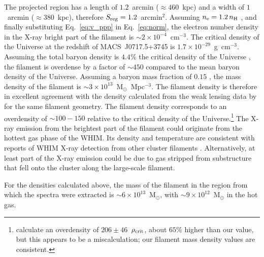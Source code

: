 The projected region has a length of $1.2$~arcmin ($\approx 460$~kpc) and a width of $1$~arcmin ($\approx 380$~kpc), therefore $S_{\rm reg} = 1.2$~arcmin$^{2}$. Assuming $n_{\rm e} = 1.2\, n_{\rm H}$ \citep[e.g.,][]{Bohringer2010}, and finally substituting Eq.~\ref{eq:v_ppp} in Eq.~\ref{eq:norm}, the electron number density in the X-ray bright part of the filament is $\sim 2\times 10^{-4}$~cm$^{-3}$. The critical density of the Universe at the redshift of MACS~J0717.5+3745 is $1.7\times 10^{-29}$~g~cm$^{-3}$. Assuming the total baryon density is $4.4\%$ the critical density of the Universe \citep{Kirkman2003}, the filament is overdense by a factor of $\sim 450$ compared to the mean baryon density of the Universe. Assuming a baryon mass fraction of $0.15$ \citep[e.g.,][]{Mantz2014}, the mass density of the filament is $\sim 3\times 10^{13}$~M$_{\odot}$~Mpc$^{-3}$. The filament density is therefore in excellent agreement with the density calculated from the weak lensing data by \citet{Jauzac2012} for the same filament geometry. The filament density corresponds to an overdensity of $\sim 100-150$ relative to the critical density of the Universe.\footnote{\citet{Jauzac2012} calculate an overdensity of $206\pm 46$~$\rho_{\rm crit}$, about $65\%$ higher than our value, but this appears to be a miscalculation; our filament mass density values are consistent.} The X-ray emission from the brightest part of the filament could originate from the hottest gas phase of the WHIM. Its density and temperature are consistent with reports of WHIM X-ray detection from other cluster filaments \citep[e.g.,][]{Werner2008, Eckert2015}. Alternatively, at least part of the X-ray emission could be due to gas stripped from substructure that fell onto the cluster along the large-scale filament.

For the densities calculated above, the mass of the filament in the region from which the spectra were extracted is $\sim 6\times 10^{13}$~M$_\odot$, with $\sim 9\times 10^{12}$~M$_\odot$ in the hot gas. 

